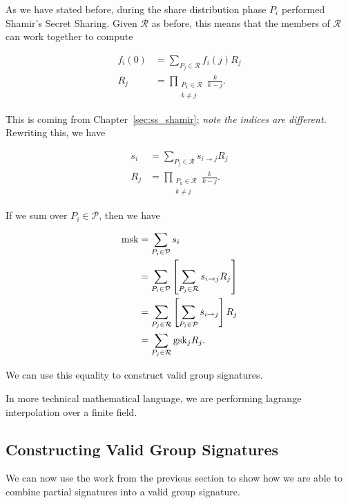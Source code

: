 As we have stated before, during the share distribution phase
$P_{i}$ performed Shamir's Secret Sharing.
Given $\mathcal{R}$ as before, this means that the members of $\mathcal{R}$
can work together to compute

\begin{align}
    f_{i}(0) &= \sum_{P_{j}\in\mathcal{R}} f_{i}(j)R_{j} \nonumber\\
    R_{j} &= \prod_{\substack{P_{k}\in\mathcal{R} \\ k\ne j}}
        \frac{k}{k-j}.
\end{align}

\noindent
This is coming from Chapter~\ref{sec:ss_shamir};
\emph{note the indices are different.}
Rewriting this, we have

\begin{align}
    s_{i} &= \sum_{P_{j}\in\mathcal{R}} s_{i\to j}R_{j} \nonumber\\
    R_{j} &= \prod_{\substack{P_{k}\in\mathcal{R} \\ k\ne j}}
        \frac{k}{k-j}.
\end{align}

\noindent
If we sum over $P_{i}\in\mathcal{P}$, then we have

\begin{align}
    \textrm{msk}{} &= \sum_{P_{i}\in\mathcal{P}} s_{i} \nonumber\\
        &= \sum_{P_{i}\in\mathcal{P}}
            \left[ \sum_{P_{j}\in\mathcal{R}} s_{i\to j}R_{j} \right]
                \nonumber\\
        &= \sum_{P_{j}\in\mathcal{R}}
            \left[ \sum_{P_{i}\in\mathcal{P}} s_{i\to j} \right]R_{j}
                \nonumber\\
        &= \sum_{P_{j}\in\mathcal{R}} \textrm{gsk}{}_{j}R_{j}.
\end{align}

\noindent
We can use this equality to construct valid group signatures.

In more technical mathematical language, we are performing
\gls{lagrange interpolation} over a \gls{finite field}.

\subsection{Constructing Valid Group Signatures}

We can now use the work from the previous section to show
how we are able to combine partial signatures into a valid group signature.

